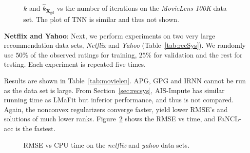 \documentclass[10pt,journal,compsoc]{IEEEtran}
\newcommand{\X}{\mathbf{X}}
\begin{document}
\begin{figure}[ht]
	\centering
	
	\vspace{-10px}
	\caption{$k$ and $\hat{k}_{\X_{\text{gd}}}$ 
		vs the number of iterations 
		on the 
		\textit{MovieLens-100K} data set.
	The plot of TNN is similar and thus not shown.}
	\label{fig:rankmatcomp2}
\end{figure}

\noindent
\textbf{Netflix and Yahoo}:
Next, we perform experiments on two very large recommendation
data sets,
\textit{Netflix}
and \textit{Yahoo}
(Table~\ref{tab:recSys}).
We randomly use $50\%$ 
of the observed ratings 
for training,
$25\%$ for validation and the rest for testing.
Each experiment is repeated five times. 

Results are shown in Table~\ref{tab:movielen}.
\textsf{APG}, \textsf{GPG} and \textsf{IRNN} cannot be run as the
data set
is large.
From Section~\ref{sec:recsys},
\textsf{AIS-Impute} has similar running time as \textsf{LMaFit} but inferior
performance,
and thus is not compared.
Again, the nonconvex regularizers converge faster, yield lower RMSE's and solutions of much
lower ranks.
Figure~\ref{fig:large:rmse} shows the RMSE vs time,
and \textsf{FaNCL-acc} is the fastest.



\begin{figure}[ht]
\centering

\vspace{-10px}
\caption{RMSE vs CPU time on the \textit{netflix} and \textit{yahoo} data sets.}
\label{fig:large:rmse}
\end{figure}
\end{document}
